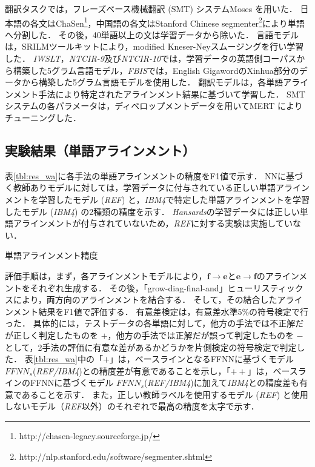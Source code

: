 \documentclass[japanese]{jnlp_1.4}
\begin{document}
翻訳タスクでは，フレーズベース機械翻訳 (SMT) システムMoses \cite{Koehn07}を用いた．
日本語の各文はChaSen\footnote{http://chasen-legacy.sourceforge.jp/}，中国語の各文はStanford Chinese segmenter\footnote{http://nlp.stanford.edu/software/segmenter.shtml}により単語へ分割した．
その後，40単語以上の文は学習データから除いた．
言語モデルは，SRILMツールキット\cite{stolcke02}により，modified Kneser-Neyスムージング\cite{kneser95,chen98}を行い学習した．
{\it IWSLT}，{\it NTCIR-9}及び{\it NTCIR-10}では，学習データの英語側コーパスから構築した5グラム言語モデル，{\it FBIS}では，English GigawordのXinhua部分のデータから構築した5グラム言語モデルを使用した．
翻訳モデルは，各単語アラインメント手法により特定されたアラインメント結果に基づいて学習した．
SMTシステムの各パラメータは，ディベロップメントデータを用いてMERT \cite{FOch03}によりチューニングした．


\subsection{実験結果（単語アラインメント）}
\label{sect:res_alignment}

表\ref{tbl:res_wa}に各手法の単語アラインメントの精度をF1値で示す．
NNに基づく教師ありモデルに対しては，学習データに付与されている正しい単語アラインメントを学習したモデル ({\it REF}) と，{\it IBM4}で特定した単語アラインメントを学習したモデル ({\it IBM4}) の2種類の精度を示す．
{\it Hansards}の学習データには正しい単語アラインメントが付与されていないため，{\it REF}に対する実験は実施していない．

\begin{table}[b]
\caption{単語アラインメント精度}
\label{tbl:res_wa}

\end{table}

評価手順は，まず，各アラインメントモデルにより，$\boldsymbol{f} \rightarrow \boldsymbol{e}$と$\boldsymbol{e} \rightarrow \boldsymbol{f}$のアラインメントをそれぞれ生成する．
その後，「grow-diag-final-and」ヒューリスティックス\cite{koehn03}により，両方向のアラインメントを結合する．
そして，その結合したアラインメント結果をF1値で評価する．
有意差検定は，有意差水準5\%の符号検定で行った．
具体的には，テストデータの各単語に対して，他方の手法では不正解だが正しく判定したものを $+$，他方の手法では正解だが誤って判定したものを $-$ として，2手法の評価に有意な差があるかどうかを片側検定の符号検定で判定した．
表\ref{tbl:res_wa}中の「$+$」は，ベースラインとなるFFNNに基づくモデル $\mathit{FFNN}_{s}$({\it REF/IBM4})との精度差が有意であることを示し，「$++$」は，ベースラインのFFNNに基づくモデル $\mathit{FFNN}_{s}$({\it REF/IBM4})に加えて{\it IBM4}との精度差も有意であることを示す．
また，正しい教師ラベルを使用するモデル ({\it REF}) と使用しないモデル（{\it REF}以外）のそれぞれで最高の精度を太字で示す．
\end{document}
